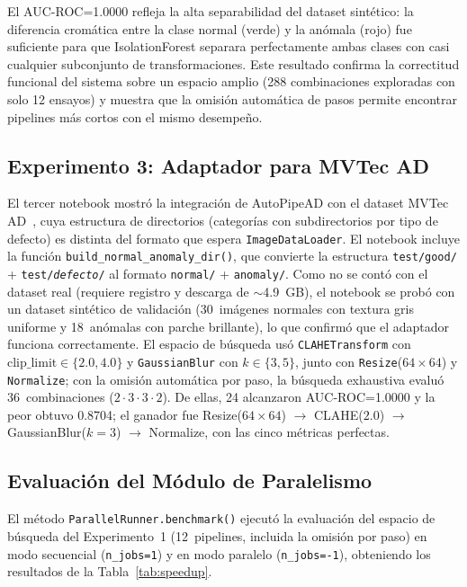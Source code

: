 \documentclass[conference,spanish]{IEEEtran}
\begin{document}
El AUC-ROC=1.0000 refleja la alta separabilidad del dataset sintético: la
diferencia cromática entre la clase normal (verde) y la anómala (rojo) fue
suficiente para que IsolationForest separara perfectamente ambas clases
con casi cualquier subconjunto de transformaciones. Este resultado
confirma la correctitud funcional del sistema sobre un espacio amplio
(288 combinaciones exploradas con solo 12 ensayos) y muestra que la
omisión automática de pasos permite encontrar pipelines más cortos con el
mismo desempeño.

\subsection{Experimento 3: Adaptador para MVTec AD}

El tercer notebook  mostró la integración
de AutoPipeAD con el dataset MVTec AD~\cite{bergmann2019mvtec}, cuya
estructura de directorios (categorías con subdirectorios por tipo de
defecto) es distinta del formato que espera \texttt{ImageDataLoader}. El
notebook incluye la función \texttt{build\_normal\_anomaly\_dir()}, que
convierte la estructura \texttt{test/good/} + \texttt{test/\textit{defecto}/}
al formato \texttt{normal/} + \texttt{anomaly/}. Como no se contó con el
dataset real (requiere registro y descarga de
$\sim$4.9~GB), el notebook se probó con un dataset sintético de
validación (30~imágenes normales con textura gris uniforme y
18~anómalas con parche brillante), lo que confirmó que el adaptador
funciona correctamente. El espacio de búsqueda usó \texttt{CLAHETransform}
con $\text{clip\_limit} \in \{2.0, 4.0\}$ y \texttt{GaussianBlur} con
$k \in \{3, 5\}$, junto con \texttt{Resize}($64\times64$) y
\texttt{Normalize}; con la omisión automática por paso, la búsqueda
exhaustiva evaluó 36~combinaciones ($2\cdot3\cdot3\cdot2$). De ellas,
24 alcanzaron AUC-ROC=1.0000 y la peor obtuvo 0.8704; el ganador fue
Resize($64\times64$) $\to$ CLAHE($2.0$) $\to$ GaussianBlur($k=3$) $\to$
Normalize, con las cinco métricas perfectas.

\subsection{Evaluación del Módulo de Paralelismo}

El método \texttt{ParallelRunner.benchmark()} ejecutó la evaluación del
espacio de búsqueda del Experimento~1 (12~pipelines, incluida la omisión
por paso) en modo secuencial (\texttt{n\_jobs=1}) y en modo paralelo
(\texttt{n\_jobs=-1}), obteniendo los resultados de la
Tabla~\ref{tab:speedup}.
\end{document}
